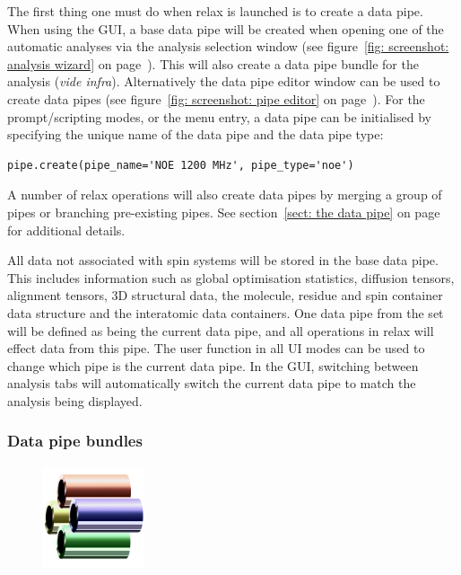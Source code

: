 The first thing one must do when relax is launched is to create a data pipe.
When using the GUI, a base data pipe will be created when opening one of the automatic analyses via the analysis selection window (see figure~\ref{fig: screenshot: analysis wizard} on page~\pageref{fig: screenshot: analysis wizard}).
This will also create a data pipe bundle for the analysis (\textit{vide infra}).
Alternatively the data pipe editor window can be used to create data pipes (see figure~\ref{fig: screenshot: pipe editor} on page~\pageref{fig: screenshot: pipe editor}).
For the prompt/scripting modes, or the  menu entry, a data pipe can be initialised by specifying the unique name of the data pipe and the data pipe type:

\begin{lstlisting}
pipe.create(pipe_name='NOE 1200 MHz', pipe_type='noe')
\end{lstlisting}

A number of relax operations will also create data pipes by merging a group of pipes or branching pre-existing pipes.
See section~\ref{sect: the data pipe} on page~\pageref{sect: the data pipe} for additional details.

All data not associated with spin systems will be stored in the base data pipe.
This includes information such as global optimisation statistics, diffusion tensors, alignment tensors, 3D structural data, the molecule, residue and spin container data structure and the interatomic data containers.
One data pipe from the set will be defined as being the current data pipe, and all operations in relax will effect data from this pipe.
The  user function in all UI modes can be used to change which pipe is the current data pipe.
In the GUI, switching between analysis tabs will automatically switch the current data pipe to match the analysis being displayed.


\subsubsection{Data pipe bundles} \label{sect: data pipe bundles}

\begin{figure}[h]
  \includegraphics[width=3cm, bb=0 0 1701 1701]{graphics/misc/pipe_bundle_600x600}
\end{figure}

